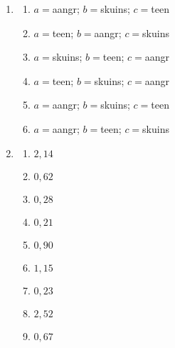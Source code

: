  \begin{solutions}{}{
\begin{enumerate}[itemsep=5pt, label=\textbf{\arabic*}. ] 


\item %
\begin{multicols}{2}
\begin{enumerate}[noitemsep, label=\textbf{(\alph*)} ]
\item $a=$aangr; $b=$skuins; $c=$teen
\item $a=$teen; $b=$aangr; $c=$skuins
\item $a=$skuins; $b=$teen; $c=$aangr
\item $a=$teen; $b=$skuins; $c=$aangr
\item $a=$aangr; $b=$skuins; $c=$teen
\item $a=$aangr; $b=$teen; $c=$skuins
\end{enumerate}
\end{multicols}
\item %
\begin{multicols}{2}
\begin{enumerate}[noitemsep, label=\textbf{(\alph*)} ]
\item $2,14$%
\item $0,62$%
\item $0,28$%
\item $0,21$%
\item $0,90$%
\item $1,15$%
\item $0,23$%
\item $2,52$%
\item $0,67$%
\end{enumerate}


\end{multicols}
\end{enumerate}}
\end{solutions}
